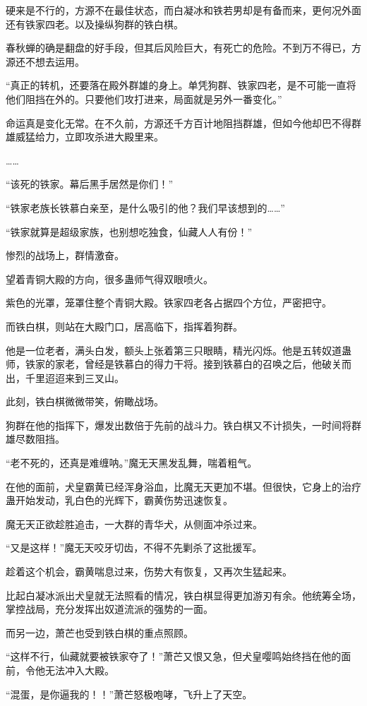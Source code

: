 \begin{this_body}
硬来是不行的，方源不在最佳状态，而白凝冰和铁若男却是有备而来，更何况外面还有铁家四老。以及操纵狗群的铁白棋。

春秋蝉的确是翻盘的好手段，但其后风险巨大，有死亡的危险。不到万不得已，方源还不想去运用。

“真正的转机，还要落在殿外群雄的身上。单凭狗群、铁家四老，是不可能一直将他们阻挡在外的。只要他们攻打进来，局面就是另外一番变化。”

命运真是变化无常。在不久前，方源还千方百计地阻挡群雄，但如今他却巴不得群雄威猛给力，立即攻杀进大殿里来。

……

“该死的铁家。幕后黑手居然是你们！”

“铁家老族长铁慕白亲至，是什么吸引的他？我们早该想到的……”

“铁家就算是超级家族，也别想吃独食，仙藏人人有份！”

惨烈的战场上，群情激奋。

望着青铜大殿的方向，很多蛊师气得双眼喷火。

紫色的光罩，笼罩住整个青铜大殿。铁家四老各占据四个方位，严密把守。

而铁白棋，则站在大殿门口，居高临下，指挥着狗群。

他是一位老者，满头白发，额头上张着第三只眼睛，精光闪烁。他是五转奴道蛊师，铁家的家老，曾经是铁慕白的得力干将。接到铁慕白的召唤之后，他破关而出，千里迢迢来到三叉山。

此刻，铁白棋微微带笑，俯瞰战场。

狗群在他的指挥下，爆发出数倍于先前的战斗力。铁白棋又不计损失，一时间将群雄尽数阻挡。

“老不死的，还真是难缠呐。”魔无天黑发乱舞，喘着粗气。

在他的面前，犬皇霸黄已经浑身浴血，比魔无天更加不堪。但很快，它身上的治疗蛊开始发动，乳白色的光辉下，霸黄伤势迅速恢复。

魔无天正欲趁胜追击，一大群的青华犬，从侧面冲杀过来。

“又是这样！”魔无天咬牙切齿，不得不先剿杀了这批援军。

趁着这个机会，霸黄喘息过来，伤势大有恢复，又再次生猛起来。

比起白凝冰派出犬皇就无法照看的情况，铁白棋显得更加游刃有余。他统筹全场，掌控战局，充分发挥出奴道流派的强势的一面。

而另一边，萧芒也受到铁白棋的重点照顾。

“这样不行，仙藏就要被铁家夺了！”萧芒又恨又急，但犬皇嘤鸣始终挡在他的面前，令他无法冲入大殿。

“混蛋，是你逼我的！！”萧芒怒极咆哮，飞升上了天空。


\end{this_body}
